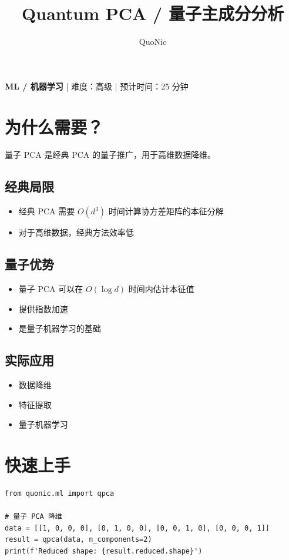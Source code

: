 \documentclass[12pt,a4paper]{article}
\title{Quantum PCA / 量子主成分分析}
\author{QuoNic}
\date{}
\begin{document}
\maketitle

\begin{center}
\textbf{ML / 机器学习} | 难度：高级 | 预计时间：25 分钟
\end{center}

\tableofcontents
\newpage

\section{为什么需要？}

量子 PCA 是经典 PCA 的量子推广，用于高维数据降维。

\subsection{经典局限}
\begin{itemize}
  \item 经典 PCA 需要 $O(d^3)$ 时间计算协方差矩阵的本征分解
  \item 对于高维数据，经典方法效率低
\end{itemize}

\subsection{量子优势}
\begin{itemize}
  \item 量子 PCA 可以在 $O(\log d)$ 时间内估计本征值
  \item 提供指数加速
  \item 是量子机器学习的基础
\end{itemize}

\subsection{实际应用}
\begin{itemize}
  \item 数据降维
  \item 特征提取
  \item 量子机器学习
\end{itemize}

\section{快速上手}

\begin{verbatim}
from quonic.ml import qpca

# 量子 PCA 降维
data = [[1, 0, 0, 0], [0, 1, 0, 0], [0, 0, 1, 0], [0, 0, 0, 1]]
result = qpca(data, n_components=2)
print(f'Reduced shape: {result.reduced.shape}')
\end{verbatim}
\end{document}
